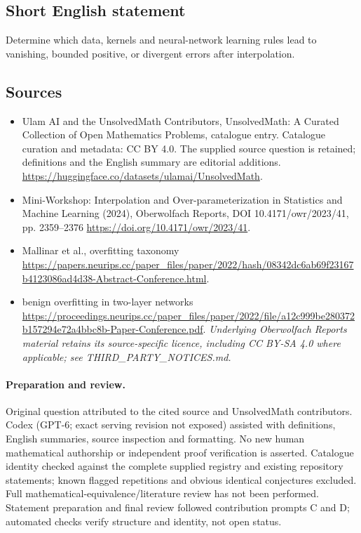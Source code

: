 \documentclass[11pt]{article}
\begin{document}
\subsection{Short English statement}
Determine which data, kernels and neural-network learning rules lead to vanishing, bounded positive, or divergent errors after interpolation.
\subsection{Sources}
\begin{itemize}
\item[\hypertarget{source:statement:1}{S1}] Ulam AI and the UnsolvedMath Contributors, UnsolvedMath: A Curated Collection of Open Mathematics Problems, catalogue entry. Catalogue curation and metadata: CC BY 4.0. The supplied source question is retained; definitions and the English summary are editorial additions.
\url{https://huggingface.co/datasets/ulamai/UnsolvedMath}.
\item[\hypertarget{source:statement:2}{S2}] Mini-Workshop: Interpolation and Over-parameterization in Statistics and Machine Learning​ (2024), Oberwolfach Reports, DOI 10.4171/owr/2023/41, pp. 2359--2376
\url{https://doi.org/10.4171/owr/2023/41}.
\item[\hypertarget{source:statement:3}{S3}] Mallinar et al., overfitting taxonomy
\url{https://papers.neurips.cc/paper_files/paper/2022/hash/08342dc6ab69f23167b4123086ad4d38-Abstract-Conference.html}.
\item[\hypertarget{source:statement:4}{S4}] benign overfitting in two-layer networks
\url{https://proceedings.neurips.cc/paper_files/paper/2022/file/a12c999be280372b157294e72a4bbc8b-Paper-Conference.pdf}.
\textit{Underlying Oberwolfach Reports material retains its source-specific licence, including CC BY-SA 4.0 where applicable; see THIRD\_PARTY\_NOTICES.md.}
\end{itemize}
\paragraph{Preparation and review.}
Original question attributed to the cited source and UnsolvedMath contributors. Codex (GPT-6; exact serving revision not exposed) assisted with definitions, English summaries, source inspection and formatting. No new human mathematical authorship or independent proof verification is asserted. Catalogue identity checked against the complete supplied registry and existing repository statements; known flagged repetitions and obvious identical conjectures excluded. Full mathematical-equivalence/literature review has not been performed. Statement preparation and final review followed contribution prompts C and D; automated checks verify structure and identity, not open status.
\label{end:statement}
\end{document}
